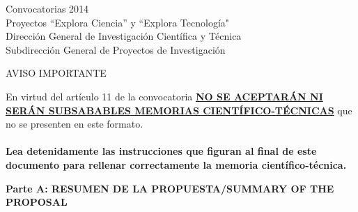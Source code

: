 \documentclass[a4paper,11pt,oneside]{article}
\begin{document}


\begin{tcolorbox}[colback=white,arc=0pt,outer arc=0pt,colframe=black,boxrule=0.6pt]
\begin{center}
Convocatorias 2014\\ 
Proyectos ``Explora Ciencia'' y  ``Explora Tecnología" \\ 
Dirección General de Investigación Científica y Técnica \\
Subdirección General de Proyectos de Investigación
\end{center} 
\end{tcolorbox}

\begin{tcolorbox}[colback=yellow,arc=0pt,outer arc=0pt,colframe=black,boxrule=0.6pt,left=0mm,right=0mm]
  \begin{center}
    AVISO IMPORTANTE\\
  \end{center}
    En virtud del art\'iculo 11 de la convocatoria \ul{\textbf{NO SE ACEPTAR\'AN NI SER\'AN SUBSABABLES MEMORIAS CIENT\'IFICO-T\'ECNICAS}} que no se presenten en este formato.\\
    \\
    \textbf{Lea detenidamente las instrucciones que figuran al final de este documento para rellenar correctamente la memoria cient\'ifico-t\'ecnica.}
    \\
\end{tcolorbox}
\vspace{3pt}
\begin{tcolorbox}[colback=yellow,arc=0pt,outer arc=0pt,colframe=black,boxrule=0.6pt,left=0mm]
  \noindent\textbf{Parte A: RESUMEN DE LA PROPUESTA/SUMMARY OF THE PROPOSAL}
\end{tcolorbox}


\end{document}
